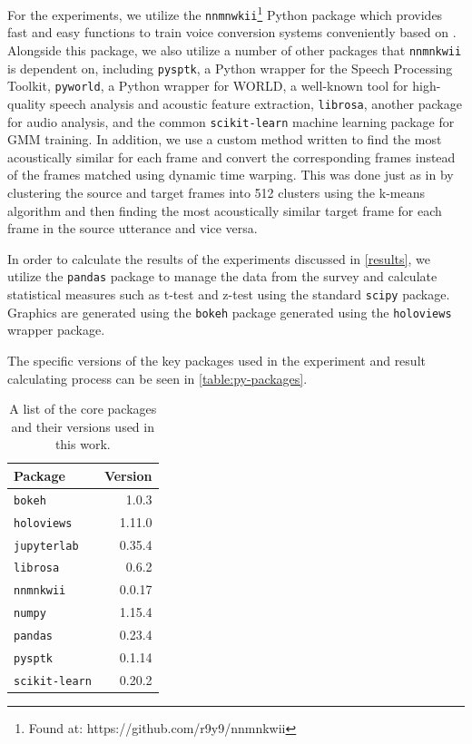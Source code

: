 \documentclass
[
    a4paper,
    twoside,
    12pt,
]
{report}
\begin{document}
For the experiments, we utilize the
\texttt{nnmnwkii}\footnote{Found at: https://github.com/r9y9/nnmnkwii}
Python package which provides fast and easy functions to train voice
conversion systems conveniently based on \textcite{toda2007}. Alongside
this package, we also utilize a number of other packages that
\texttt{nnmnkwii} is dependent on, including \texttt{pysptk}, a Python
wrapper for the Speech Processing Toolkit, \texttt{pyworld}, a Python
wrapper for WORLD, a well-known tool for high-quality speech analysis
and acoustic feature extraction, \texttt{librosa}, another package for
audio analysis, and the common \texttt{scikit-learn} machine learning
package for GMM training. In addition, we use a custom method written to
find the most acoustically similar for each frame and convert the
corresponding frames instead of the frames matched using dynamic time
warping. This was done just as in \textcite{aryal2014} by clustering the
source and target frames into 512 clusters using the k-means algorithm
and then finding the most acoustically similar target frame for each
frame in the source utterance and vice versa.

In order to calculate the results of the experiments discussed in
\autoref{results}, we utilize the \texttt{pandas} package to manage the
data from the survey and calculate statistical measures such as t-test
and z-test using the standard \texttt{scipy} package. Graphics are
generated using the \texttt{bokeh} package generated using the
\texttt{holoviews} wrapper package.

The specific versions of the key packages used in the experiment and
result calculating process can be seen in \autoref{table:py-packages}.

\begin{table}[]
\centering
\begin{tabular}{|l|r|}
\hline
\textbf{Package} & \textbf{Version} \\ \hline
\texttt{bokeh}            & 1.0.3            \\ \hline
\texttt{holoviews}        & 1.11.0           \\ \hline
\texttt{jupyterlab}      & 0.35.4           \\ \hline
\texttt{librosa}          & 0.6.2            \\ \hline
\texttt{nnmnkwii}         & 0.0.17           \\ \hline
\texttt{numpy}         & 1.15.4           \\ \hline
\texttt{pandas}           & 0.23.4           \\ \hline
\texttt{pysptk}          & 0.1.14           \\ \hline
\texttt{scikit-learn}     & 0.20.2           \\ \hline
\end{tabular}
\caption{A list of the core packages and their versions used in this work.}
\label{table:py-packages}
\end{table}
\end{document}
